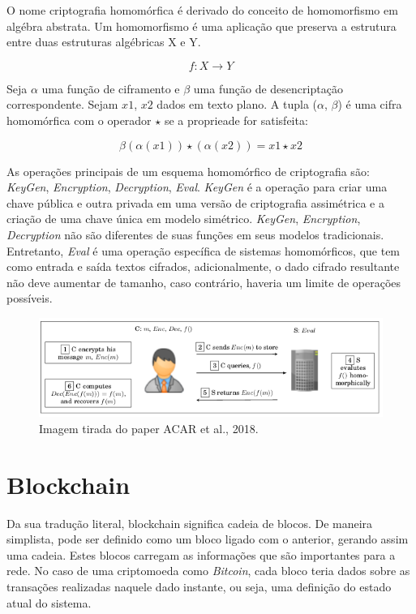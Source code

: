 \documentclass{ufsctex/ufsctex}
\begin{document}
O nome criptografia homomórfica é derivado do conceito de homomorfismo em
algébra abstrata. Um homomorfismo é uma aplicação que preserva a estrutura
entre duas estruturas algébricas X e Y.

\begin{equation}
{f} : X \longrightarrow Y
\end{equation}

Seja $\alpha$ uma função de ciframento e $\beta$ uma função de desencriptação
correspondente. Sejam $x1$, $x2$ dados em texto plano. A tupla ($\alpha$, $\beta$)
é uma cifra homomórfica com o operador $\star$ se a proprieade for satisfeita:

\begin{equation}
\beta (\alpha(x1)) \star (\alpha(x2)) = x1 \star x2
\end{equation}

As operações principais de um esquema homomórfico de criptografia são: \textit{KeyGen},
\textit{Encryption}, \textit{Decryption}, \textit{Eval}. \textit{KeyGen} é a operação
para criar uma chave pública e outra privada em uma versão de criptografia assimétrica
e a criação de uma chave única em modelo simétrico. \textit{KeyGen}, \textit{Encryption},
\textit{Decryption} não são diferentes de suas funções em seus modelos tradicionais. 
Entretanto, \textit{Eval} é uma operação específica de sistemas homomórficos, que tem
como entrada e saída textos cifrados, adicionalmente, o dado cifrado resultante não deve
aumentar de tamanho, caso contrário, haveria um limite de operações possíveis.\cite{survey-homo}

\begin{figure}[h]
	\centering
	\includegraphics[scale=0.4]{crypto-homo}
	\caption{Imagem tirada do paper ACAR et al., 2018.}
	\label{fig:crypto-homo}
\end{figure}


\section{Blockchain}

Da sua tradução literal, blockchain significa cadeia de blocos. De  maneira
simplista, pode ser definido como um bloco ligado com o anterior, gerando
assim uma cadeia. Estes blocos carregam as informações que são importantes para
a rede. No caso de uma criptomoeda como \textit{Bitcoin}, cada bloco teria dados sobre
as transações realizadas naquele dado instante, ou seja, uma definição do estado
atual do sistema.
\end{document}
